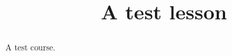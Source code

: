 \documentclass{xourse}
\title{A test lesson}
\begin{document}
\begin{abstract}
  A test course.
\end{abstract}
\maketitle
{}
\end{document}
